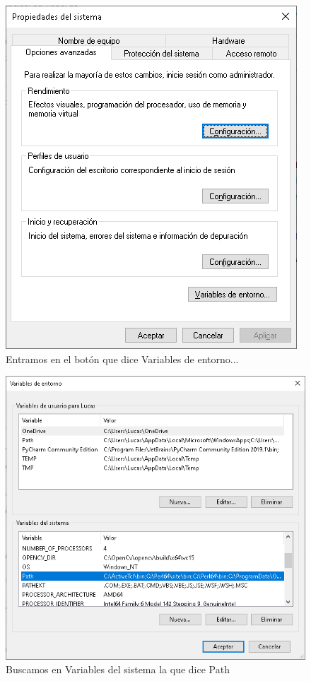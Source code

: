 \begin{figure}[H]
    \centering
    \includegraphics[scale=0.3]{imagenes/cmd/cmd_3.PNG}
    \caption{Entramos en el bot\'on que dice Variables de entorno...}
\end{figure}

\begin{figure}[H]
    \centering
    \includegraphics[scale=0.3]{imagenes/cmd/cmd_4.PNG}
    \caption{Buscamos en Variables del sistema la que dice Path}
\end{figure}

